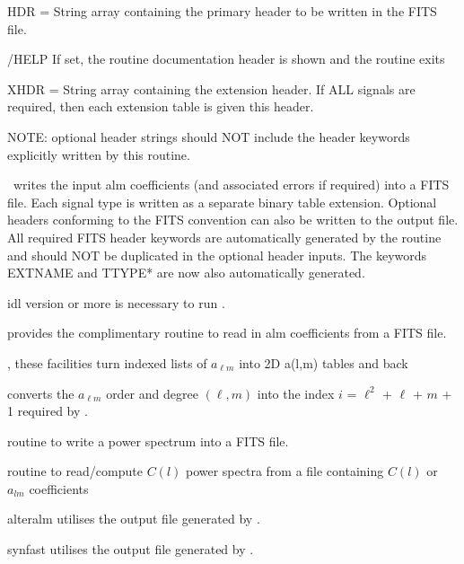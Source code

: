 \begin{keywords}
  \begin{kwlist}{} %
    \item[HDR =] String array containing the primary header to be written in the FITS
      file. 
    \item[/HELP] If set, the routine documentation header is shown and the routine exits	
    \item[XHDR =] String array containing the extension header. If
                  ALL signals are required, then each extension table
                  is given this header.
    \item[ ] NOTE: optional header strings should NOT include the
             header keywords explicitly written by this routine.
  \end{kwlist}
\end{keywords}  

\begin{codedescription}
{\thedocid\ writes the input alm coefficients (and associated errors if 
required) into a FITS file. Each signal type is written as a separate
binary table extension. Optional headers conforming
to the FITS convention can also be written to the output file. All
required FITS header keywords are automatically generated by the
routine and should NOT be duplicated in the optional header inputs.
The keywords EXTNAME and TTYPE* are now also automatically generated.
}
\end{codedescription}



\begin{related}
  \begin{sulist}{} %
    \item[idl] version \idlversion or more is necessary to run \thedocid.
    \item[\htmlref{fits2alm}{idl:fits2alm}] provides the complimentary routine to read in 
      alm coefficients from a FITS file.
    \item[\htmlref{alm\_i2t}{idl:alm_i2t}, \htmlref{alm\_t2i}{idl:alm_t2i}]
these facilities turn indexed lists of $a_{\ell m}$ into 2D a(l,m) tables and back
    \item[\htmlref{lm2index}{idl:lm2index}] converts the $a_{\ell m}$ order and degree
    $(\ell, m)$ into the index $i$ = $\ell^2$ + $\ell$ + $m$ + 1 required by
\thedocid.
    \item[\htmlref{cl2fits}{idl:cl2fits}] routine to write a power spectrum into
a FITS file.
    \item[\htmlref{fits2cl}{idl:fits2cl}] routine to read/compute $C(l)$ power spectra from a file containing $C(l)$ or $a_{lm}$ coefficients
    \item[alteralm] utilises the output file generated by \thedocid.
    \item[synfast] utilises the output file generated by \thedocid.
  \end{sulist}
\end{related}

